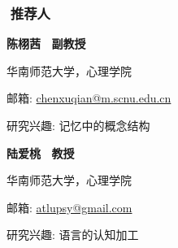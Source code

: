 \documentclass[a4paper, 12pt]{ctexart}
\begin{document}
\newpage


\subsubsection*{ \ \ 推荐人}




\begin{multicols}{2}
    
    \ \ \textbf{陈栩茜 \ 副教授} \par
    \ \ 华南师范大学，心理学院 \par
    \ \ 邮箱: \href{mailto: chenxuqian@m.scnu.edu.cn}{chenxuqian@m.scnu.edu.cn} \par
    \ \ 研究兴趣: 记忆中的概念结构	\par
    
    \columnbreak

    \ \ \textbf{陆爱桃 \ 教授}  \par
    \ \ 华南师范大学，心理学院 \par
    \ \ 邮箱: \href{mailto: atlupsy@gmail.com}{atlupsy@gmail.com} \par
    \ \ 研究兴趣: 语言的认知加工 \par
    
    \end{multicols}
\end{document}
